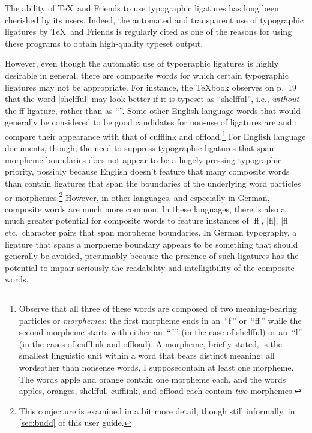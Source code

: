 \documentclass[11pt]{article}
\newcommand{\pkg}[1]{\textsf{#1}}
\begin{document}
The ability of \TeX\ and Friends to use typographic ligatures has long been cherished by its users. Indeed, the automated and transparent use of typographic ligatures by \TeX\ and Friends is regularly cited as one of the reasons for using these programs to obtain high-quality typeset output.

However, even though the automatic use of typographic ligatures is highly desirable in general, there are composite words for which certain typographic ligatures may not be appropriate. For instance, the \TeX book observes on p.~19 that the word |shelfful| may look better if it is typeset as \enquote{shelfful}, i.e., \emph{without} the ff-ligature, rather than as \enquote{}. Some other English-language words that would generally be considered to be good candidates for non-use of ligatures are  and ; compare their appearance with that of cufflink and offload.\footnote{Observe that all three of these words are composed of two meaning-bearing particles or \emph{morphemes}: the first morpheme ends in an~\enquote{f\,} or~\enquote{ff\,} while the second morpheme starts with either an~\enquote{f\,} (in the case of shelfful) or an~\enquote{l} (in the cases of cufflink and offload). A \href{http://en.wikipedia.org/wiki/Morpheme}{morpheme}, briefly stated, is the smallest linguistic unit within a word that bears distinct meaning; all words\textemdash other than nonsense words, I suppose\textemdash contain at least one morpheme. The words apple and orange contain one morpheme each, and the words apples, oranges, shelfful, cufflink, and offload each contain \emph{two} morphemes.}
For English language documents, though, the need to suppress typographic ligatures that span morpheme boundaries does not appear to be a hugely pressing typographic priority, possibly because English doesn't feature that many composite words than contain ligatures that span the boundaries of the underlying word particles or morphemes.\footnote{This conjecture is examined in a bit more detail, though still informally, in \cref{sec:budd} of this user guide.} However, in other languages, and especially in German, composite words are much more common. In these languages, there is also a much greater potential for composite words to feature instances of |ff|, |fi|, |fl| etc.\ character pairs that span morpheme boundaries. In German typography, a ligature that spans a morpheme boundary appears to be something that should generally be avoided, presumably because the presence of such ligatures has the potential to impair seriously the readability and intelligibility of the composite words.
\end{document}
